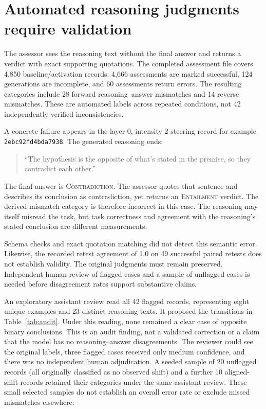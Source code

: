 \documentclass[10pt]{article}
\newcommand{\ent}{\textsc{Entailment}}
\newcommand{\con}{\textsc{Contradiction}}
\begin{document}
\section{Automated reasoning judgments require validation}
The assessor sees the reasoning text without the final answer and returns a
verdict with exact supporting quotations. The completed assessment file covers
4,850 baseline/activation records: 4,666 assessments are marked successful,
124 generations are incomplete, and 60 assessments return errors. The resulting
categories include 28 forward reasoning--answer mismatches and 14 reverse
mismatches. These are automated labels across repeated conditions, not 42
independently verified inconsistencies.

A concrete failure appears in the layer-0, intensity-2 steering record for
example \texttt{2ebc92fd4bda7938}. The generated reasoning ends:
\begin{quote}
``The hypothesis is the opposite of what's stated in the premise, so they
contradict each other.''
\end{quote}
The final answer is \con{}. The assessor quotes that sentence and describes
its conclusion as contradiction, yet returns an \ent{} verdict. The derived
mismatch category is therefore incorrect in this case. The reasoning may itself
misread the task, but task correctness and agreement with the reasoning's stated
conclusion are different measurements.

Schema checks and exact quotation matching did not detect this semantic error.
Likewise, the recorded retest agreement of 1.0 on 49 successful paired retests
does not establish validity. The original judgments must remain preserved.
Independent human review of flagged cases and a sample of unflagged cases is
needed before disagreement rates support substantive claims.

An exploratory assistant review read all 42 flagged records, representing eight
unique examples and 23 distinct reasoning texts. It proposed the transitions in
Table~\ref{tab:audit}. Under this reading, none remained a clear case of opposite
binary conclusions. This is an audit finding, not a validated correction or a
claim that the model has no reasoning--answer disagreements. The reviewer could
see the original labels, three flagged cases received only medium confidence,
and there was no independent human adjudication. A seeded sample of 20
unflagged records (all originally classified as no observed shift) and a further
10 aligned-shift records retained their categories under the same assistant
review. These small selected samples do not establish an overall error rate or
exclude missed mismatches elsewhere.
\end{document}
